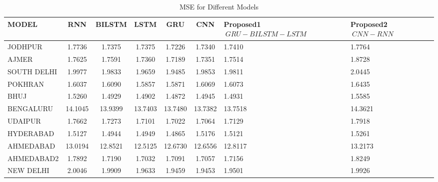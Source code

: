 \documentclass[a4paper,fleqn]{cas-sc}
\begin{document}
\begin{table}[!ht]
\centering
\caption{MSE for Different Models}
\begin{tabular}{|l|c|c|c|c|c|p{}|p{}|}
\hline
\textbf{MODEL} & \textbf{RNN} & \textbf{BILSTM} & \textbf{LSTM} & \textbf{GRU} & \textbf{CNN} &\textbf{Proposed1 \(\ GRU-BILSTM-LSTM \)\ } & \textbf{Proposed2 \(\ CNN-RNN\)\ } \\ \hline
JODHPUR & 1.7736 & 1.7375 & 1.7375 & 1.7226 & 1.7340 & 1.7410 & 1.7764 \\ \hline
AJMER & 1.7625 & 1.7591 & 1.7360 & 1.7189 & 1.7351 & 1.7514 & 1.8728 \\ \hline
SOUTH DELHI & 1.9977 & 1.9833 & 1.9659 & 1.9485 & 1.9853 & 1.9811 & 2.0445 \\ \hline
POKHRAN & 1.6037 & 1.6090 & 1.5857 & 1.5871 & 1.6069 & 1.6073 & 1.6435 \\ \hline
BHUJ & 1.5260 & 1.4929 & 1.4902 & 1.4872 & 1.4945 & 1.4931 & 1.5585 \\ \hline
BENGALURU & 14.1045 & 13.9399 & 13.7403 & 13.7480 & 13.7382 & 13.7518 & 14.3621 \\ \hline
UDAIPUR & 1.7662 & 1.7273 & 1.7101 & 1.7022 & 1.7064 & 1.7129 & 1.7918 \\ \hline
HYDERABAD & 1.5127 & 1.4944 & 1.4949 & 1.4865 & 1.5176 & 1.5121 & 1.5261 \\ \hline
AHMEDABAD & 13.0194 & 12.8521 & 12.5125 & 12.6730 & 12.6556 & 12.8117 & 13.2173 \\ \hline
AHMEDABAD2 & 1.7892 & 1.7190 & 1.7032 & 1.7091 & 1.7057 & 1.7156 & 1.8249 \\ \hline
NEW DELHI & 2.0046 & 1.9909 & 1.9633 & 1.9459 & 1.9453 & 1.9501 & 1.9926 \\ \hline

\end{tabular}
\end{table}
\end{document}
